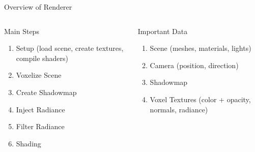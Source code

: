 \documentclass[10pt]{beamer}
\begin{document}
\begin{frame}{Overview of Renderer}


  \begin{columns}
    \begin{column}{0.5\textwidth}
      \begin{block}{Main Steps}
        \begin{enumerate}
          \item Setup (load scene, create textures, compile shaders)
          \item Voxelize Scene
          \item Create Shadowmap
          \item Inject Radiance
          \item Filter Radiance
          \item Shading
        \end{enumerate}
      \end{block}
    \end{column}
    \begin{column}{0.5\textwidth}
      \begin{block}{Important Data}
        \begin{enumerate}
          \item Scene (meshes, materials, lights)
          \item Camera (position, direction) %
          \item Shadowmap %
          \item Voxel Textures (color + opacity, normals, radiance)
        \end{enumerate}
      \end{block}
    \end{column}
  \end{columns}
\end{frame}
\end{document}
